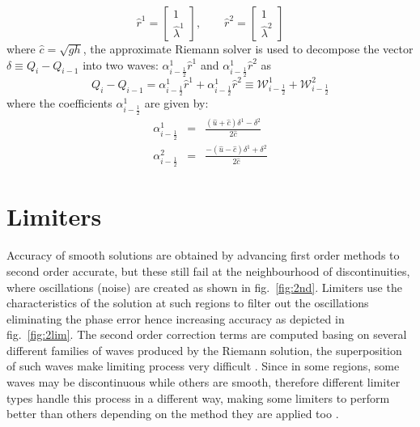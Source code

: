 \documentclass[12pt,a4paper]{article}
\begin{document}
\begin{equation}
\hat{r}^1 =  \begin{bmatrix} 1 \\ 	\hat{\lambda}^1 \end{bmatrix}, \qquad 	\hat{r}^2 =  
\begin{bmatrix} 1 \\ 	\hat{\lambda}^2 \end{bmatrix}
\label{vec}
\end{equation}
where $\hat{c} = \sqrt{gh}$, the approximate Riemann solver is used to decompose the vector  $ \delta \equiv Q_{i} - Q_{i-1}$ into two waves: $\alpha_{i-\frac{1}{2}}^{1} \hat{r}^1$ and $\alpha_{i-\frac{1}{2}}^{1} \hat{r}^2$ as 
\begin{equation}
Q_{i} - Q_{i-1} = \alpha_{i-\frac{1}{2}}^{1} \hat{r}^1 + \alpha_{i-\frac{1}{2}}^{1} \hat{r}^2 \equiv \mathcal{W}_{i-\frac{1}{2}}^{1} + \mathcal{W}_{i-\frac{1}{2}}^{2}
\end{equation}
where the coefficients $\alpha_{i-\frac{1}{2}}^{1}$ are given by:
\begin{eqnarray}
\alpha_{i-\frac{1}{2}}^{1} &=& \frac{(\hat{u} + \hat{c})\delta^{1} - \delta^2}{2\hat{c}}\\
\alpha_{i-\frac{1}{2}}^{2} &=& \frac{-(\hat{u} - \hat{c})\delta^{1} + \delta^2}{2\hat{c}}
\end{eqnarray}
	
\section{Limiters}
Accuracy of smooth solutions are obtained by advancing first order methods to second order accurate, but these still fail at the neighbourhood of discontinuities, where oscillations (noise) are created as shown in fig.~\ref{fig:2nd}. Limiters use the characteristics of the solution at such regions to filter out the oscillations eliminating the phase error hence increasing accuracy as depicted in fig.~\ref{fig:2lim}. The second order correction terms are computed basing on several different families of waves produced by the Riemann solution, the superposition of such waves make limiting process very difficult \cite{ge:2011} .  Since in some regions, some waves may be discontinuous while others are smooth, therefore different limiter types handle this process in a different way, making some limiters to perform better than others depending on the method they are applied too \cite{be-ge-le-ma:2011}.\\
	
\end{document}
